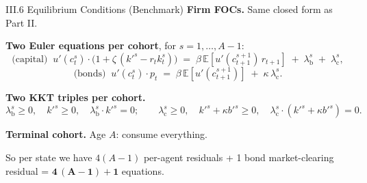 \documentclass[aspectratio=169,11pt]{beamer}
\newcommand{\E}[1]{\mathbb{E}\!\left[#1\right]}
\begin{document}
\begin{frame}{III.6 Equilibrium Conditions (Benchmark)}
\small
\textbf{Firm FOCs.}  Same closed form as Part II.

\vspace{0.3em}
\textbf{Two Euler equations per cohort}, for $s = 1, \ldots, A-1$:
\[
\text{(capital)}\;\;
u'(c_t^s) \cdot \bigl(1 + \zeta\,(k'^s - r_t k_t^s)\bigr) \;=\; \beta\,\E{u'(c_{t+1}^{s+1})\,r_{t+1}} \;+\; \lambda_{\text{b}}^s \;+\; \lambda_{\text{c}}^s,
\]
\[
\text{(bonds)}\;\;
u'(c_t^s)\cdot p_t \;=\; \beta\,\E{u'(c_{t+1}^{s+1})} \;+\; \kappa\,\lambda_{\text{c}}^s.
\]

\vspace{0.3em}
\textbf{Two KKT triples per cohort.}
\[
\lambda_{\text{b}}^s \ge 0,\quad k'^s \ge 0,\quad \lambda_{\text{b}}^s\cdot k'^s = 0;
\qquad
\lambda_{\text{c}}^s \ge 0,\quad k'^s + \kappa b'^s \ge 0,\quad \lambda_{\text{c}}^s\cdot (k'^s + \kappa b'^s) = 0.
\]

\vspace{0.3em}
\textbf{Terminal cohort.}  Age $A$: consume everything.

\vspace{0.4em}
{\footnotesize So per state we have $4(A-1)$ per-agent residuals + 1 bond market-clearing residual = $\bm{4\,(A-1) + 1}$ equations.}
\end{frame}
\end{document}
